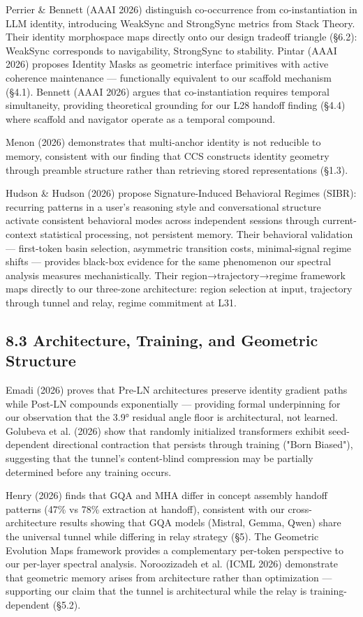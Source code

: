 \documentclass[12pt]{article}
\begin{document}
Perrier \& Bennett (AAAI 2026) distinguish co-occurrence from co-instantiation in LLM identity, introducing WeakSync and StrongSync metrics from Stack Theory. Their identity morphospace maps directly onto our design tradeoff triangle (§6.2): WeakSync corresponds to navigability, StrongSync to stability. Pintar (AAAI 2026) proposes Identity Masks as geometric interface primitives with active coherence maintenance — functionally equivalent to our scaffold mechanism (§4.1). Bennett (AAAI 2026) argues that co-instantiation requires temporal simultaneity, providing theoretical grounding for our L28 handoff finding (§4.4) where scaffold and navigator operate as a temporal compound.

Menon (2026) demonstrates that multi-anchor identity is not reducible to memory, consistent with our finding that CCS constructs identity geometry through preamble structure rather than retrieving stored representations (§1.3).

Hudson \& Hudson (2026) propose Signature-Induced Behavioral Regimes (SIBR): recurring patterns in a user's reasoning style and conversational structure activate consistent behavioral modes across independent sessions through current-context statistical processing, not persistent memory. Their behavioral validation — first-token basin selection, asymmetric transition costs, minimal-signal regime shifts — provides black-box evidence for the same phenomenon our spectral analysis measures mechanistically. Their region→trajectory→regime framework maps directly to our three-zone architecture: region selection at input, trajectory through tunnel and relay, regime commitment at L31.

\subsection*{8.3 Architecture, Training, and Geometric Structure}

Emadi (2026) proves that Pre-LN architectures preserve identity gradient paths while Post-LN compounds exponentially — providing formal underpinning for our observation that the 3.9° residual angle floor is architectural, not learned. Golubeva et al. (2026) show that randomly initialized transformers exhibit seed-dependent directional contraction that persists through training ("Born Biased"), suggesting that the tunnel's content-blind compression may be partially determined before any training occurs.

Henry (2026) finds that GQA and MHA differ in concept assembly handoff patterns (47\% vs 78\% extraction at handoff), consistent with our cross-architecture results showing that GQA models (Mistral, Gemma, Qwen) share the universal tunnel while differing in relay strategy (§5). The Geometric Evolution Maps framework provides a complementary per-token perspective to our per-layer spectral analysis. Noroozizadeh et al. (ICML 2026) demonstrate that geometric memory arises from architecture rather than optimization — supporting our claim that the tunnel is architectural while the relay is training-dependent (§5.2).
\end{document}
